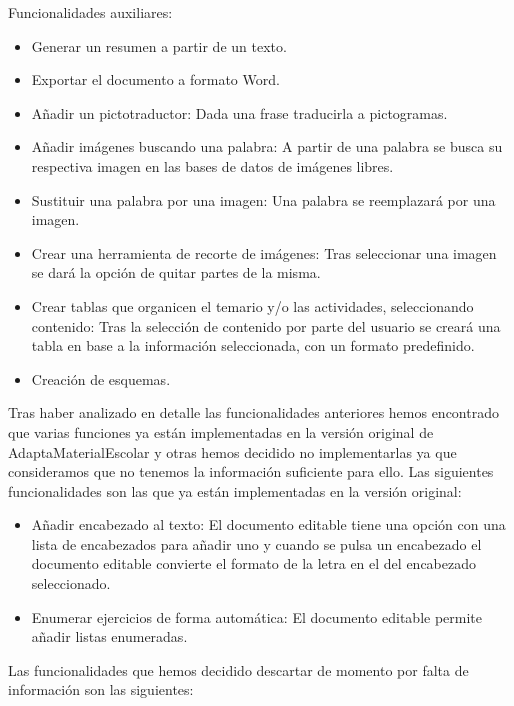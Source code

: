 Funcionalidades auxiliares:
\begin{itemize}
  \item Generar un resumen a partir de un texto.
  \item Exportar el documento a formato Word.
  \item Añadir un pictotraductor: Dada una frase traducirla a pictogramas.
  \item Añadir imágenes buscando una palabra: A partir de una palabra se busca su respectiva imagen en las bases de datos de imágenes libres.
  \item Sustituir una palabra por una imagen: Una palabra se reemplazará por una imagen.
  \item Crear una herramienta de recorte de imágenes: Tras seleccionar una imagen se dará la opción de quitar partes de la misma.
  \item Crear tablas que organicen el temario y/o las actividades, seleccionando contenido: Tras la selección de contenido por parte del usuario se creará una tabla en base a la información seleccionada, con un formato predefinido.
  \item Creación de esquemas.
\end{itemize}
Tras haber analizado en detalle las funcionalidades anteriores hemos encontrado que varias funciones ya están implementadas en la versión original de AdaptaMaterialEscolar y otras hemos decidido no implementarlas ya que consideramos que no tenemos la información suficiente para ello. Las siguientes funcionalidades son las que ya están implementadas en la versión original:
\begin{itemize}
  \item Añadir encabezado al texto: El documento editable tiene una opción con una lista de encabezados para añadir uno y cuando se pulsa un encabezado el documento editable convierte el formato de la letra en el del encabezado seleccionado.
  \item Enumerar ejercicios de forma automática: El documento editable permite añadir listas enumeradas.
\end{itemize}
Las funcionalidades que hemos decidido descartar de momento por falta de información son las siguientes:
